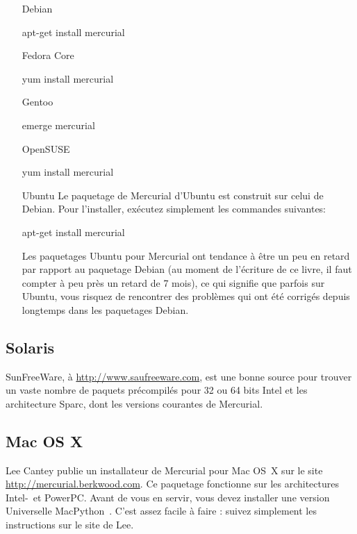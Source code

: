 \begin{itemize}
\item[Debian]
  \begin{codesample4}
    apt-get install mercurial
  \end{codesample4}

\item[Fedora Core]
  \begin{codesample4}
    yum install mercurial
  \end{codesample4}

\item[Gentoo]
  \begin{codesample4}
    emerge mercurial
  \end{codesample4}

\item[OpenSUSE]
  \begin{codesample4}
    yum install mercurial
  \end{codesample4}

\item[Ubuntu] Le paquetage de Mercurial d'Ubuntu est construit sur celui de Debian. 
              Pour l'installer, exécutez simplement les commandes suivantes:
  \begin{codesample4}
    apt-get install mercurial
  \end{codesample4}
  Les paquetages Ubuntu pour Mercurial ont tendance à être un peu en retard
  par rapport au paquetage Debian (au moment de l'écriture de ce livre, il
  faut compter à peu près un retard de 7 mois), ce qui signifie que parfois 
  sur Ubuntu, vous risquez de rencontrer des problèmes qui ont été corrigés 
  depuis longtemps dans les paquetages Debian.
\end{itemize}

\subsection{Solaris}

SunFreeWare, à \url{http://www.saufreeware.com}, est une bonne source 
pour trouver un vaste nombre de paquets précompilés pour 32 ou 64 bits
Intel et les architecture Sparc, dont les versions courantes de Mercurial.

\subsection{Mac OS X}

Lee Cantey publie un installateur de Mercurial pour Mac OS~X sur le site 
\url{http://mercurial.berkwood.com}.  Ce paquetage fonctionne sur les 
architectures Intel-~et PowerPC. Avant de vous en servir, vous devez
installer une version Universelle MacPython~\cite{web:macpython}. C'est
assez facile à faire : suivez simplement les instructions sur le site
de Lee.

